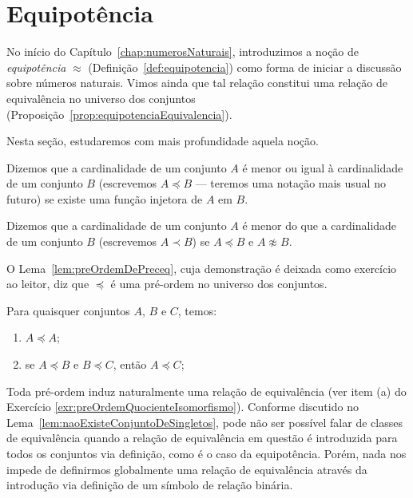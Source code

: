 \section{Equipotência}\label{sec:equipotencia}

No início do Capítulo~\ref{chap:numerosNaturais}, introduzimos a noção de \emph{equipotência} $\approx$ (Definição~\ref{def:equipotencia}) como forma de iniciar a discussão sobre números naturais.
Vimos ainda que tal relação constitui uma relação de equivalência no universo dos conjuntos (Proposição~\ref{prop:equipotenciaEquivalencia}).

Nesta seção, estudaremos com mais profundidade aquela noção.

\begin{definition}[$Z^--P$]\label{def:comparacaoDeCardinalidades}
    Dizemos que a cardinalidade de um conjunto $A$ é menor ou igual à cardinalidade de um conjunto $B$ (escrevemos $A\preceq B$ --- teremos uma notação mais usual no futuro) se existe uma função injetora de $A$ em $B$.

    Dizemos que a cardinalidade de um conjunto $A$ é menor do que a cardinalidade de um conjunto $B$ (escrevemos $A\prec B$) se $A\preceq B$ e $A\not\approx B$.
\end{definition}

O Lema~\ref{lem:preOrdemDePreceq}, cuja demonstração é deixada como exercício ao leitor, diz que $\preceq$ é uma pré-ordem no universo dos conjuntos.

\begin{lemma}[$Z^-$]\label{lem:preOrdemDePreceq}
    Para quaisquer conjuntos $A$, $B$ e $C$, temos:
    \begin{enumerate}[label=(\roman*)]
        \item $A\preceq A$;
        \item se $A\preceq B$ e $B\preceq C$, então $A\preceq C$;
    \end{enumerate}
\end{lemma}

Toda pré-ordem induz naturalmente uma relação de equivalência (ver item (a) do Exercício \ref{exr:preOrdemQuocienteIsomorfismo}).
Conforme discutido no Lema~\ref{lem:naoExisteConjuntoDeSingletos}, pode não ser possível falar de classes de equivalência quando a relação de equivalência em questão é introduzida para todos os conjuntos via definição, como é o caso da equipotência.
Porém, nada nos impede de definirmos globalmente uma relação de equivalência através da introdução via definição de um símbolo de relação binária.

